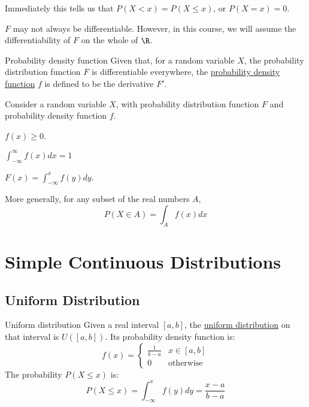 \documentclass[../Main.tex]{subfiles}
\begin{document}
Immediately this tells us that $P(X < x) = P(X \leq x)$, or $P(X = x) = 0$.\par
$F$ may not always be differentiable. However, in this course, we will assume the differentiability of $F$ on the whole of $\R$.
\begin{definition}{Probability density function}
    Given that, for a random variable $X$, the probability distribution function $F$ is differentiable everywhere, the \underline{probability density function} $f$ is defined to be the derivative $F'$.
\end{definition}
\begin{propositions}{
        Consider a random variable $X$, with probability distribution function $F$ and probability density function $f$.
        \label{propsPdensFuncProps}
    }
    \item $f(x) \geq 0$. \label{propPdensFuncNonNegative}
    \item $\int_{-\infty}^{\infty} f(x) dx = 1$ \label{propPdensFuncIntegralOne}
    \item $F(x) = \int_{-\infty}^{x} f(y) dy$. \label{propPdensFuncIntegratePDF}
\end{propositions}
More generally, for any subset of the real numbers $A$,
\begin{equation*}
    P(X \in A) = \int_A f(x) dx
\end{equation*}
\section{Simple Continuous Distributions}
\subsection{Uniform Distribution}
\begin{definition}{Uniform distribution}
    Given a real interval $[a, b]$, the \underline{uniform distribution} on that interval is $U([a, b])$. Its probability density function is: 
    \begin{equation*}
        f(x) =
        \begin{cases}
            \frac{1}{b-a} & x \in [a, b] \\
            0 & \text{otherwise}
        \end{cases}
    \end{equation*}
    The probability $P(X \leq x)$ is:
    \begin{equation*}
        P(X \leq x) = \int_{-\infty}^x f(y) dy = \frac{x - a}{b - a}
    \end{equation*}
\end{definition}
\end{document}
